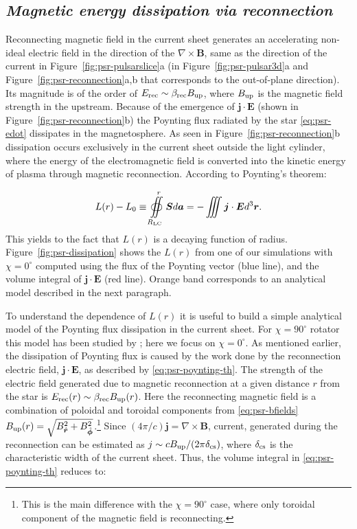 \subsection*{\small\it Magnetic energy dissipation via reconnection}

Reconnecting magnetic field in the current sheet generates an accelerating non-ideal electric field in the direction of the $\nabla\times \bm{B}$, same as the direction of the current in Figure~\ref{fig:psr-pulsarslice}a (in Figure~\ref{fig:psr-pulsar3d}a and Figure~\ref{fig:psr-reconnection}a,b that corresponds to the out-of-plane direction). Its magnitude is of the order of $E_{\rm rec}\sim \beta_{\rm rec}B_{\rm up}$, where $B_{\rm up}$ is the magnetic field strength in the upstream. Because of the emergence of $\bm{j}\cdot \bm{E}$ (shown in Figure~\ref{fig:psr-reconnection}b) the Poynting flux radiated by the star \eqref{eq:psr-edot} dissipates in the magnetosphere. As seen in Figure~\ref{fig:psr-reconnection}b dissipation occurs exclusively in the current sheet outside the light cylinder, where the energy of the electromagnetic field is converted into the kinetic energy of plasma through magnetic reconnection. According to Poynting's theorem:

\begin{equation}
\label{eq:psr-poynting-th}
    L(r) - L_0 \equiv \oiint\limits_{R_{\rm LC}}^r \bm{S} d\bm{a} = -\iiint \bm{j}\cdot \bm{E}d^3\bm{r}.
\end{equation}
\noindent This yields to the fact that $L(r)$ is a decaying function of radius. Figure~\ref{fig:psr-dissipation} shows the $L(r)$ from one of our simulations with $\chi=0^\circ$ computed using the flux of the Poynting vector (blue line), and the volume integral of $\bm{j}\cdot\bm{E}$ (red line). Orange band corresponds to an analytical model described in the next paragraph.

To understand the dependence of $L(r)$ it is useful to build a simple analytical model of the Poynting flux dissipation in the current sheet. For $\chi=90^\circ$ rotator this model has been studied by \cite{2020A&A...642A.204C}; here we focus on $\chi=0^\circ$. As mentioned earlier, the dissipation of Poynting flux is caused by the work done by the reconnection electric field, $\bm{j}\cdot\bm{E}$, as described by \eqref{eq:psr-poynting-th}. The strength of the electric field generated due to magnetic reconnection at a given distance $r$ from the star is $E_{\rm rec}(r)\sim\beta_{\rm rec} B_{\rm up}(r)$. Here the reconnecting magnetic field is a combination of poloidal and toroidal components from \eqref{eq:psr-bfields} $B_{\rm up}(r) =\sqrt{B_{\hat{\bm{r}}}^2 + B_{\hat{\bm{\phi}}}^2}$.\footnote{This is the main difference with the $\chi=90^\circ$ case, where only toroidal component of the magnetic field is reconnecting.} Since $(4\pi/c)\bm{j}=\nabla\times\bm{B}$, current, generated during the reconnection can be estimated as $j\sim c B_{\rm up} / (2\pi \delta_{\rm cs})$, where $\delta_{\rm cs}$ is the characteristic width of the current sheet. Thus, the volume integral in \eqref{eq:psr-poynting-th} reduces to:

